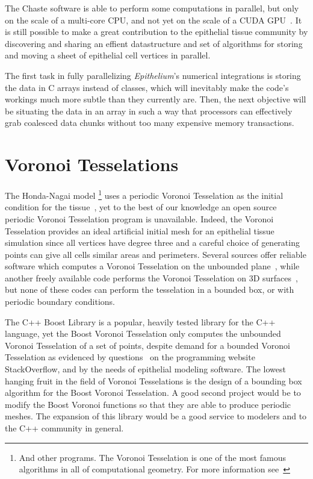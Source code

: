 The Chaste software is able to perform some computations in parallel, but only on the scale of a multi-core CPU, and not yet on the scale of a CUDA GPU~\cite{ChasteTutorial}. It is still possible to make a great contribution to the epithelial tissue community by discovering and sharing an effient datastructure and set of algorithms for storing and moving a sheet of epithelial cell vertices in parallel.

The first task in fully parallelizing \emph{Epithelium}'s numerical integrations is storing the data in C arrays instead of classes, which will inevitably make the code's workings much more subtle than they currently are. Then, the next objective will be situating the data in an array in such a way that processors can effectively grab coalesced data chunks without too many expensive memory transactions. 

\section{Voronoi Tesselations}
The Honda-Nagai model \footnote{And other programs. The Voronoi Tesselation is one of the most famous algorithms in all of computational geometry. For more information see~\cite{tessel}} uses a periodic Voronoi Tesselation as the initial condition for the tissue~\cite{HondaNagai}, yet to the best of our knowledge an open source periodic Voronoi Tesselation program is unavailable. Indeed, the Voronoi Tesselation provides an ideal artificial initial mesh for an epithelial tissue simulation since all vertices have degree three and a careful choice of generating points can give all cells similar areas and perimeters. Several sources offer reliable software which computes a Voronoi Tesselation on the unbounded plane~\cite{boost, triangle}, while another freely available code performs the Voronoi Tesselation on 3D surfaces~\cite{voro++}, but none of these codes can perform the tesselation in a bounded box, or with periodic boundary conditions. 

The C++ Boost Library is a popular, heavily tested library for the C++ language, yet the Boost Voronoi Tesselation only computes the unbounded Voronoi Tesselation of a set of points, despite demand for a bounded Voronoi Tesselation as evidenced by questions~\cite{q1} on the programming website StackOverflow, and by the needs of epithelial modeling software. The lowest hanging fruit in the field of Voronoi Tesselations is the design of a bounding box algorithm for the Boost Voronoi Tesselation. A good second project would be to modify the Boost Voronoi functions so that they are able to produce periodic meshes. The expansion of this library would be a good service to modelers and to the C++ community in general.

